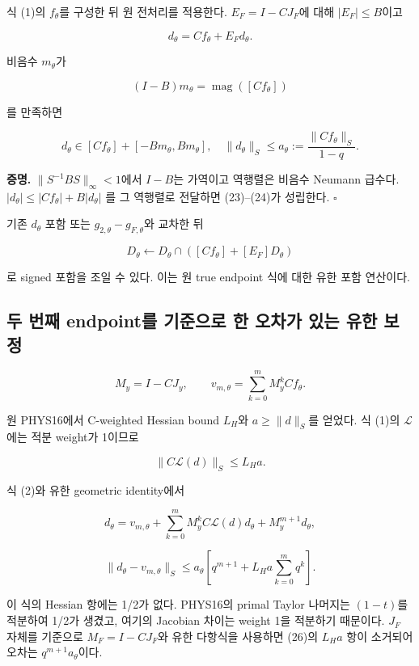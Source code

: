 식 (1)의 \(f_\theta\)를 구성한 뒤 원 전처리를 적용한다. \(E_F=I-CJ_F\)에 대해 \(\lvert E_F\rvert\le B\)이고

\[
d_\theta=Cf_\theta+E_Fd_\theta.
\]

비음수 \(m_\theta\)가

\[
\boxed{(I-B)m_\theta=\operatorname{mag}([Cf_\theta])}
\tag{23}
\]

를 만족하면

\[
\boxed{d_\theta\in[Cf_\theta]+[-Bm_\theta,Bm_\theta],
\quad \|d_\theta\|_S\le a_\theta:=\frac{\|Cf_\theta\|_S}{1-q}.}
\tag{24}
\]

\textbf{증명.} \(\lVert S^{-1}BS\rVert_\infty<1\)에서 \(I-B\)는 가역이고 역행렬은 비음수 Neumann 급수다. \(\lvert d_\theta\rvert\le\lvert Cf_\theta\rvert+B\lvert d_\theta\rvert\) 를 그 역행렬로 전달하면 (23)--(24)가 성립한다. \(\square\)

기존 \(d_\theta\) 포함 또는 \(g_{2,\theta}-g_{F,\theta}\)와 교차한 뒤

\[
D_\theta\leftarrow D_\theta\cap([Cf_\theta]+[E_F]D_\theta)
\]

로 signed 포함을 조일 수 있다. 이는 원 true endpoint 식에 대한 유한 포함 연산이다.

\hypertarget{uxb450-uxbc88uxc9f8-endpointuxb97c-uxae30uxc900uxc73cuxb85c-uxd55c-uxc624uxcc28uxac00-uxc788uxb294-uxc720uxd55c-uxbcf4uxc815}{%
\subsection{두 번째 endpoint를 기준으로 한 오차가 있는 유한 보정}\label{uxb450-uxbc88uxc9f8-endpointuxb97c-uxae30uxc900uxc73cuxb85c-uxd55c-uxc624uxcc28uxac00-uxc788uxb294-uxc720uxd55c-uxbcf4uxc815}}

\[
M_y=I-CJ_y,\qquad v_{m,\theta}=\sum_{k=0}^mM_y^kCf_\theta.
\]

원 PHYS16에서 C-weighted Hessian bound \(L_H\)와 \(a\ge\lVert d\rVert_S\)를 얻었다. 식 (1)의 \(\mathcal L\)에는 적분 weight가 1이므로

\[
\|C\mathcal L(d)\|_S\le L_Ha.
\]

식 (2)와 유한 geometric identity에서

\[
\boxed{d_\theta=v_{m,\theta}
+\sum_{k=0}^mM_y^kC\mathcal L(d)d_\theta
+M_y^{m+1}d_\theta,}
\tag{25}
\]

\[
\boxed{\|d_\theta-v_{m,\theta}\|_S
\le a_\theta\left[q^{m+1}+L_Ha\sum_{k=0}^mq^k\right].}
\tag{26}
\]

이 식의 Hessian 항에는 1/2가 없다. PHYS16의 primal Taylor 나머지는 \((1-t)\)를 적분하여 1/2가 생겼고, 여기의 Jacobian 차이는 weight 1을 적분하기 때문이다. \(J_F\) 자체를 기준으로 \(M_F=I-CJ_F\)와 유한 다항식을 사용하면 (26)의 \(L_Ha\) 항이 소거되어 오차는 \(q^{m+1}a_\theta\)이다.

